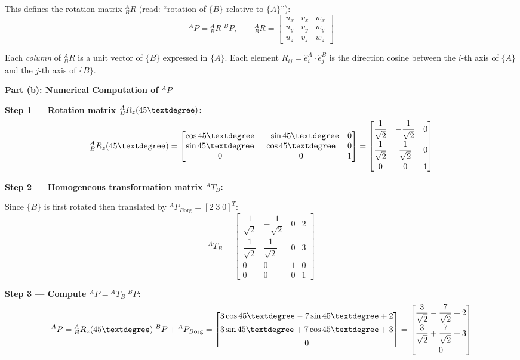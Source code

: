 \documentclass[12pt,a3paper]{article}
\begin{document}
\begin{enumerate}
\begin{tcolorbox}[enhanced,breakable,ansbox,colback=cB!4,colframe=cB,
  boxrule=0.8pt,arc=5pt,
  title={\textbf{Answer}},fonttitle=\bfseries\color{white},
  colbacktitle=cB]
This defines the rotation matrix ${}^A_BR$ (read: ``rotation of $\{B\}$
relative to $\{A\}$''):
\[
  \boxed{{}^AP = {}^A_BR\;{}^BP}, \qquad
  {}^A_BR =
  \begin{bmatrix}
    u_x & v_x & w_x\\
    u_y & v_y & w_y\\
    u_z & v_z & w_z
  \end{bmatrix}
\]

Each \emph{column} of ${}^A_BR$ is a unit vector of $\{B\}$ expressed in
$\{A\}$. Each element $R_{ij} = \hat{e}^A_i \cdot \hat{e}^B_j$ is the
direction cosine between the $i$-th axis of $\{A\}$ and the $j$-th axis
of $\{B\}$.

\medskip
\textbf{Part (b): Numerical Computation of ${}^AP$}

\medskip
\textbf{Step 1 — Rotation matrix ${}^A_BR_z(45\textdegree)$:}
\[
  {}^A_BR_z(45\textdegree)
  = \begin{bmatrix}
      \cos45\textdegree & -\sin45\textdegree & 0 \\
      \sin45\textdegree &  \cos45\textdegree & 0 \\
      0 & 0 & 1
    \end{bmatrix}
  = \begin{bmatrix}
      \dfrac{1}{\sqrt{2}} & -\dfrac{1}{\sqrt{2}} & 0 \\[8pt]
      \dfrac{1}{\sqrt{2}} &  \dfrac{1}{\sqrt{2}} & 0 \\[8pt]
      0 & 0 & 1
    \end{bmatrix}
\]

\textbf{Step 2 — Homogeneous transformation matrix ${}^AT_B$:}

Since $\{B\}$ is first rotated then translated by
${}^AP_{B\text{org}} = [2\;3\;0]^T$:
\[
  {}^AT_B
  = \begin{bmatrix}
      \dfrac{1}{\sqrt{2}} & -\dfrac{1}{\sqrt{2}} & 0 & 2 \\[8pt]
      \dfrac{1}{\sqrt{2}} &  \dfrac{1}{\sqrt{2}} & 0 & 3 \\[8pt]
      0 & 0 & 1 & 0 \\
      0 & 0 & 0 & 1
    \end{bmatrix}
\]

\textbf{Step 3 — Compute ${}^AP = {}^AT_B\;{}^BP$:}
\[
  {}^AP
  = {}^A_BR_z(45\textdegree)\;{}^BP + {}^AP_{B\text{org}}
  = \begin{bmatrix}
      3\cos45\textdegree - 7\sin45\textdegree + 2 \\[4pt]
      3\sin45\textdegree + 7\cos45\textdegree + 3 \\[4pt]
      0
    \end{bmatrix}
  = \begin{bmatrix}
      \dfrac{3}{\sqrt{2}} - \dfrac{7}{\sqrt{2}} + 2 \\[8pt]
      \dfrac{3}{\sqrt{2}} + \dfrac{7}{\sqrt{2}} + 3 \\[8pt]
      0
    \end{bmatrix}
\]


\end{tcolorbox}
\end{enumerate}
\end{document}

